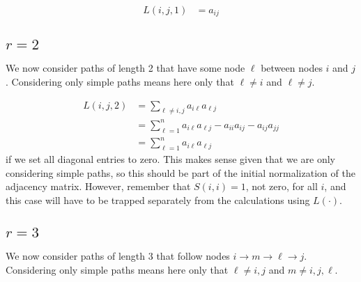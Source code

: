 \documentclass[11pt]{article} %
\begin{document}
\begin{align}
  L(i,j,1) &= a_{ij}
\end{align}

\subsection{$r=2$}
We now consider paths of length 2 that have some node $\ell$ between nodes $i$ and $j$.  Considering only simple paths means here only that $\ell\neq i$ and $\ell\neq j$.

\begin{align}
  L(i,j,2) &= \sum_{\ell \neq i,j} a_{i\ell} a_{\ell j} \\
           &= \sum_{\ell=1}^n a_{i\ell} a_{\ell j} - a_{ii} a_{ij} - a_{ij} a_{jj} \\
           &= \sum_{\ell=1}^n a_{i\ell} a_{\ell j}
\end{align}
if we set all diagonal entries to zero.  This makes sense given that we are only considering simple paths, so this should be part of the initial normalization of the adjacency matrix.  However, remember that $S(i,i)=1$, not zero, for all $i$, and this case will have to be trapped separately from the calculations using $L(\cdot)$.

\subsection{$r=3$}
We now consider paths of length 3 that follow nodes $i \to m \to \ell \to j$.  Considering only simple paths means here only that $\ell\neq i,j$ and $m\neq i,j,\ell$.
\end{document}

